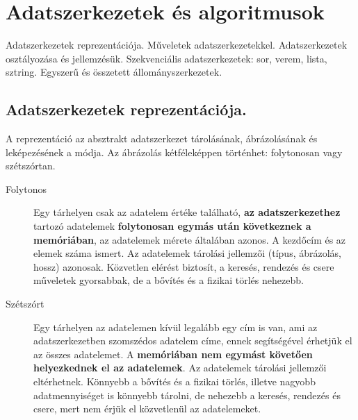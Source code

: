 \section{Adatszerkezetek és algoritmusok}
{\footnotesize Adatszerkezetek reprezentációja. Műveletek adatszerkezetekkel. Adatszerkezetek osztályozása és jellemzésük. Szekvenciális adatszerkezetek: sor, verem, lista, sztring. Egyszerű és összetett állományszerkezetek.}
\subsection{Adatszerkezetek reprezentációja.}
A reprezentáció az absztrakt adatszerkezet tárolásának, ábrázolásának és leképezésének a módja. Az ábrázolás kétféleképpen történhet: folytonosan vagy szétszórtan.
\begin{description}
	\item[Folytonos] Egy tárhelyen csak az adatelem értéke található, \textbf{az adatszerkezethez} tartozó adatelemek \textbf{folytonosan egymás után következnek a memóriában}, az adatelemek mérete általában azonos. A kezdőcím és az elemek száma ismert. Az adatelemek tárolási jellemzői (típus, ábrázolás, hossz) azonosak. Közvetlen elérést biztosít, a keresés, rendezés és csere műveletek gyorsabbak, de a bővítés és a fizikai törlés nehezebb.
	\item[Szétszórt] Egy tárhelyen az adatelemen kívül legalább egy cím is van, ami az adatszerkezetben szomszédos adatelem címe, ennek segítségével érhetjük el az összes adatelemet. A \textbf{memóriában nem egymást követően helyezkednek el az adatelemek}. Az adatelemek tárolási jellemzői eltérhetnek. Könnyebb a bővítés és a fizikai törlés, illetve nagyobb adatmennyiséget is könnyebb tárolni, de nehezebb a keresés, rendezés és csere, mert nem érjük el közvetlenül az adatelemeket.
\end{description}

